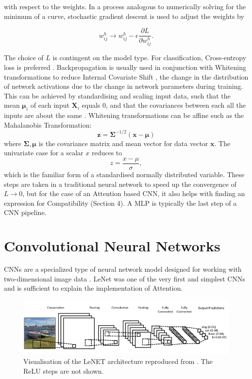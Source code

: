 \documentclass[11pt]{article}
\begin{document}
with respect to the weights. In a process analogous to numerically solving for the minimum of a curve, stochastic gradient descent is used to adjust the weights by 

\begin{equation}
w^{h}_{ij} \rightarrow w^{h}_{ij} - \epsilon\frac{\partial L}{\partial w^{h}_{ij}}.
\end{equation}

The choice of $L$ is contingent on the model type. For classification, Cross-entropy loss is preferred \cite{golik}. Backpropagation is usually used in conjunction with Whitening transformations to reduce Internal Covariate Shift \cite{batch}, the change in the distribution of network activations due to the change in network parameters during training. This can be achieved by standardising and scaling input data, such that the mean $\bm{\mu}_i$ of each input $\bm{X}_i$ equals 0, and that the covariances between each all the inputs are about the same \cite{lecun}. Whitening transformations can be affine such as the Mahalanobis Transformation:
\begin{equation}
\bm{z} = \bm{\Sigma}^{-1/2}(\bm{x}-\bm{\mu})
\end{equation}
where $\bm{\Sigma}, \bm{\mu}$ is the covariance matrix and mean vector for data vector $\bm{x}$. The univariate case for a scalar $x$ reduces to
\begin{equation}
z = \frac{x-\mu}{\sigma},
\end{equation}
which is the familiar form of a standardised normally distributed variable. These steps are taken in a traditional neural network to speed up the convergence of $L \rightarrow 0$, but for the case of an Attention based CNN, it also helps with finding an expression for Compatibility (Section 4).  A MLP is typically the last step of a CNN pipeline.


\section{Convolutional Neural Networks}

CNNs are a specialized type of neural network model designed for working with two-dimensional image data \cite{valueva}. LeNet was one of the very first and simplest CNNs \cite{culurciello} and is sufficient to explain the implementation of Attention.
\begin{figure}[htp]
    \centering
    \includegraphics[width=17cm]{figures/cnn.png}
    \caption{Visualisation of the LeNET architecture reproduced from \cite{vogel}. The ReLU steps are not shown.}
 \end{figure}  
\end{document}
